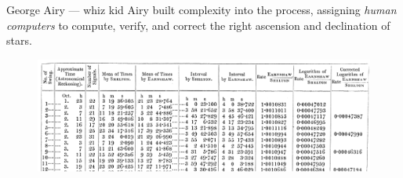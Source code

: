 \documentclass[presentation]{subfiles}
\begin{document}
\begin{frame}{George Airy --- whiz kid}
    Airy built complexity into the process, assigning \textit{human computers} 
    to compute, verify, and correct the right ascension and declination of stars.

    \begin{figure}
    \includegraphics[width=\textwidth]{figures/complexity/pw_literature/airy.png}
    \end{figure}
\end{frame}
\end{document}
